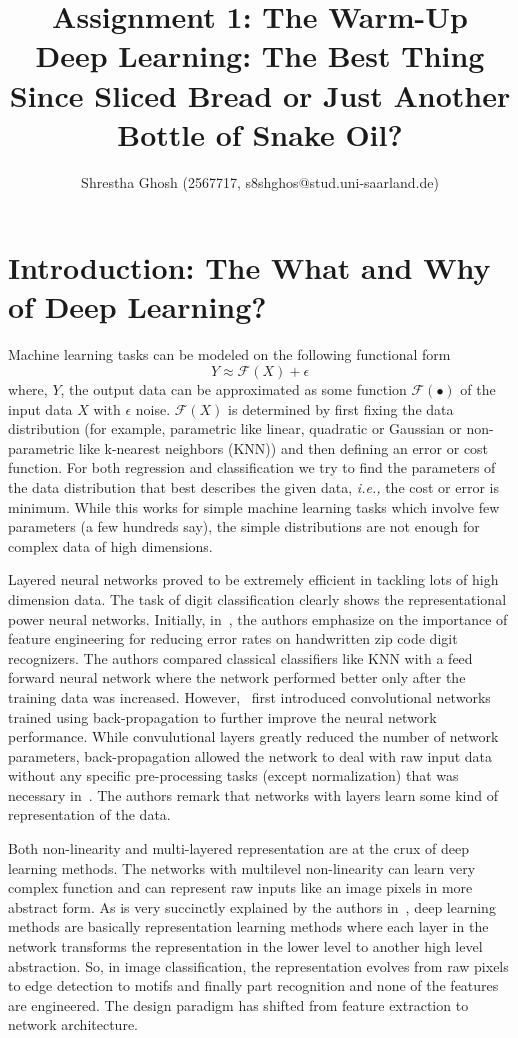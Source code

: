 \documentclass[10pt]{article}
\title{Assignment 1: The Warm-Up\\
      Deep Learning: The Best Thing Since Sliced Bread or Just Another Bottle of Snake Oil?}
\author{Shrestha Ghosh (2567717, s8shghos@stud.uni-saarland.de)}
\begin{document}
\maketitle
\section{Introduction: The What and Why of Deep Learning?}
\par Machine learning tasks can be modeled on the following functional form 
\begin{equation}
Y \approx \mathcal{F}(X) + \epsilon
\end{equation}
where, $Y$, the output data can be approximated as some function $\mathcal{F}(\bullet)$ of the input data $X$ with $\epsilon$ noise. $\mathcal{F}(X)$ is determined by first fixing the data distribution (for example, parametric like linear, quadratic or Gaussian or non-parametric like k-nearest neighbors (KNN)) and then defining an error or cost function. For both regression and classification we try to find the parameters of the data distribution that best describes the given data, \emph{i.e.,} the cost or error is minimum. While this works for simple machine learning tasks which involve few parameters (a few hundreds say), the simple distributions are not enough for complex data of high dimensions. 
\par Layered neural networks proved to be extremely efficient in tackling lots of high dimension data. The task of digit classification clearly shows the representational power neural networks. Initially, in~\cite{denker1989neural}, the authors emphasize on the importance of feature engineering for reducing error rates on  handwritten zip code digit recognizers. The authors compared classical classifiers like KNN with a feed forward neural network where the network performed better only after the training data was increased. However,~\cite{lecun1990handwritten} first introduced convolutional networks trained using back-propagation to further improve the neural network performance. While convulutional layers greatly reduced the number of network parameters, back-propagation allowed the network to deal with raw input data without any specific pre-processing tasks (except normalization) that was necessary in~\cite{denker1989neural}. The authors remark that networks with layers learn some kind of representation of the data. 
\par Both non-linearity and multi-layered representation are at the crux of deep learning methods. The networks with multilevel non-linearity can learn very complex function and can represent raw inputs like an image pixels in more abstract form. As is very succinctly explained by the authors in~\cite{lecun2015deep}, deep learning methods are basically representation learning methods where each layer in the network transforms the representation in the lower level to another high level abstraction. So, in image classification, the representation evolves from raw pixels to edge detection to motifs and finally part recognition and none of the features are engineered. The design paradigm has shifted from feature extraction to network architecture.
\end{document}
